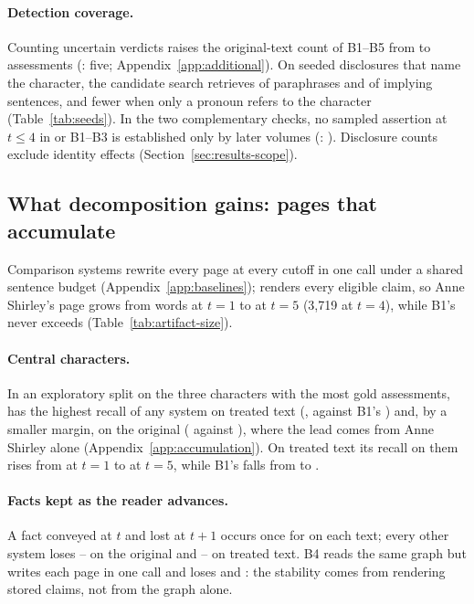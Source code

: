 \paragraph{Detection coverage.}
Counting uncertain verdicts raises the original-text count of B1--B5 from
 to  assessments (\sys: five;
Appendix~\ref{app:additional}). On seeded disclosures that name the character, the
candidate search retrieves  of paraphrases and  of
implying sentences, and fewer when only a pronoun refers to the character
(Table~\ref{tab:seeds}). In the two complementary checks, no sampled assertion at $t\le4$ in
\sys or B1--B3 is established only by later volumes (\sys: ). Disclosure
counts exclude identity effects (Section~\ref{sec:results-scope}).

\subsection{What decomposition gains: pages that accumulate}
\label{sec:results-gains}

Comparison systems rewrite every page at every cutoff in one call under a shared sentence
budget (Appendix~\ref{app:baselines}); \sys renders every eligible claim, so Anne
Shirley's page grows from  words at $t=1$ to  at $t=5$
(3,719 at $t=4$), while B1's never exceeds 
(Table~\ref{tab:artifact-size}).

\paragraph{Central characters.}
In an exploratory split on the three characters with the most gold assessments, \sys has the highest recall of
any system on treated text (, against B1's
) and, by a smaller margin, on the original (
against ), where the lead comes from Anne Shirley alone
(Appendix~\ref{app:accumulation}). On treated text its recall on them rises from
 at $t=1$ to  at $t=5$, while B1's falls
from  to .

\paragraph{Facts kept as the reader advances.}
A fact conveyed at $t$ and lost at $t+1$ occurs once for \sys on each text; every other
system loses -- on the original and
-- on treated text. B4 reads the same graph
but writes each page in one call and loses  and :
the stability comes from rendering stored claims, not from the graph alone.

